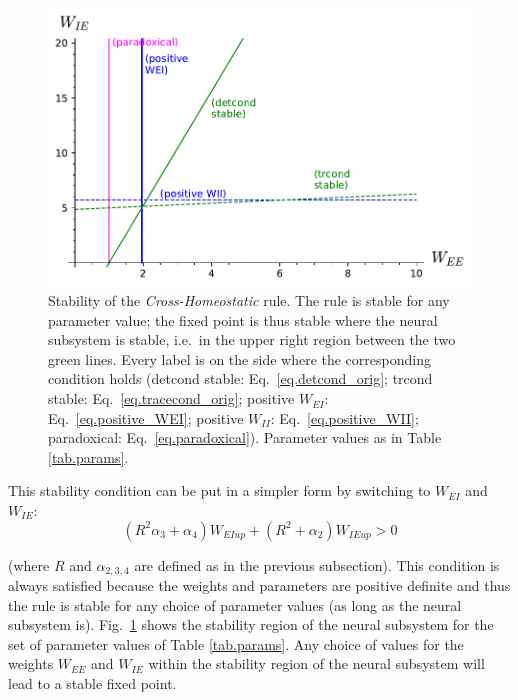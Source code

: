 \documentclass[twocolumn]{article}
\newcommand{\EE}{\mathit{EE}}
\newcommand{\EI}{\mathit{EI}}
\newcommand{\IE}{\mathit{IE}}
\newcommand{\II}{\mathit{II}}
\newcommand{\up}{\mathit{up}}
\begin{document}
\begin{figure}[ht]
\centering
\includegraphics[width=\linewidth]{CH_stability}
\caption{Stability of the {\em Cross-Homeostatic} rule. The rule is stable for any parameter value; the fixed point is thus stable where the neural subsystem is stable, i.e.\ in the upper right region between the two green lines. Every label is on the side where the corresponding condition  holds (detcond stable: Eq.\ \ref{eq.detcond_orig}; trcond stable: Eq.\ \ref{eq.tracecond_orig}; positive $W_{\EI}$: Eq.\ \ref{eq.positive_WEI}; positive $W_{\II}$: Eq.\ \ref{eq.positive_WII}; paradoxical: Eq.\ \ref{eq.paradoxical}). Parameter values as in Table \ref{tab.params}.}
\label{fig.CH_stability}
\end{figure}




This stability condition can be put in a simpler form by switching to $W_{\EI}$ and $W_{\IE}$:
\begin{equation}
(R^2 \alpha_3 + \alpha_4) W_{\EI\up} + (R^2 + \alpha_2) W_{\IE\up} > 0
\label{eq.CH_stable_cond_v2}
\end{equation}

\noindent (where $R$ and $\alpha_{2,3,4}$ are defined as in the previous subsection). This condition is always satisfied because the weights and parameters are positive definite and thus the rule is stable for any choice of parameter values (as long as the neural subsystem is). Fig.\ \ref{fig.CH_stability} shows the stability region of the neural subsystem for the set of parameter values of Table \ref{tab.params}. Any choice of values for the weights $W_{\EE}$ and $W_{\IE}$ within the stability region of the neural subsystem will lead to a stable fixed point.
\end{document}

